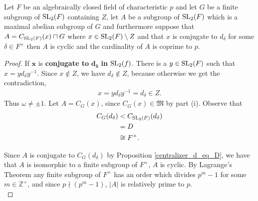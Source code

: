 \begin{theorem}
  \label{MaximalAbelianSubgroup.IsCyclic_and_card_coprime_CharP_of_IsConj_d}
  
  \leanok
  Let $F$ be an algebraically closed field of characteristic $p$ and let $G$ be a finite subgroup of $\operatorname{SL}_2(F)$ containing $Z$, let $A$ be a subgroup of $\operatorname{SL}_2(F)$ which is a maximal abelian subgroup of $G$ and furthermore suppose 
  that $A = C_{\operatorname{SL}_2(F)}(x) \sqcap G$ where $x \in \operatorname{SL}_2(F) \setminus Z$ and that $x$ is conjugate to $d_\delta$ for some $\delta \in F^\times$ then $A$ is cyclic and the cardinality of $A$ is coprime to $p$.
\end{theorem}
\begin{proof}
  \leanok
  If $\pmb{x}$ is \textbf{conjugate to} $\pmb{d_\delta}$ \textbf{in} $\operatorname{SL}_2(f)$. 
  There is a $y \in \operatorname{SL}_2(F)$ such that $x = y d_\delta y^{-1}$. Since $x \not \in Z$, we have $d_\delta \not \in Z$, because otherwise we get the contradiction,
  \begin{align*} x =  y d_\delta y^{-1} = d_\delta \in Z.
  \end{align*}
  Thus $\omega \neq \pm 1$. Let $A = C_G(x)$, since $C_G(x) \in \mathfrak{M}$ by part (i). Observe that
  \begin{align*}  C_G(d_\delta) &<  C_{\operatorname{SL}_2(F)}(d_\delta)  
  \\ &= D
  \\ &\cong F^\times.
  \end{align*}
  
  Since $A$ is conjugate to $C_G(d_\delta)$ by Proposition \ref{centralizer_d_eq_D}, 
  we have that $A$ is isomorphic to a finite subgroup of $F^\times$, $A$ is cyclic. 
  By Lagrange's Theorem any finite subgroup of $F^\times$ has an order which divides $p^m - 1$ for some 
  $m \in \mathbb{Z}^+$, and since $p \nmid (p^m - 1)$, $|A|$ is relatively prime to $p$. \\
\end{proof}


